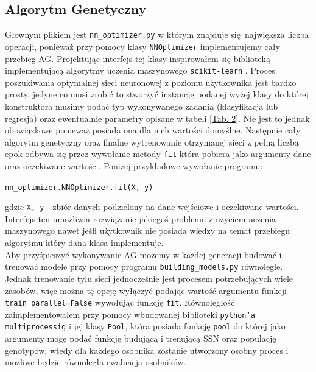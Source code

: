 \documentclass{article}
\begin{document}
\subsection{Algorytm Genetyczny}
Głownym plikiem jest \texttt{nn\_optimizer.py} w którym znajduje się największa liczba operacji,
ponieważ przy pomocy klasy \texttt{NNOptimizer} implementujemy cały przebieg AG.
Projektując interfejs tej klasy inspirowałem się biblioteką implementującą
algorytmy uczenia maszynowego \texttt{scikit-learn} \cite{sklearn_api}. Proces poszukiwania
optymalnej sieci neuronowej z poziomu użytkownika jest bardzo prosty, jedyne co musi zrobić
to stworzyć instancję podanej wyżej klasy do której konstruktora musimy podać typ wykonywanego
zadania (klasyfikacja lub regresja) oraz ewentualnie parametry opisane w tabeli 
[\hyperref[tab:params]{Tab. 2}]. Nie jest to jednak obowiązkowe ponieważ posiada ona dla nich
wartości domyślne.
Następnie cały algorytm genetyczny oraz finalne wytrenowanie otrzymanej sieci z pełną
liczbą epok odbywa się przez wywołanie metody \texttt{fit} która pobiera jako argumenty
dane oraz oczekiwane wartości. Poniżej przykładowe wywołanie programu:\\
\begin{center}
	\texttt{nn\_optimizer.NNOptimizer.fit(X, y)}\\
\end{center}
gdzie \texttt{X, y} - zbiór danych podzielony na dane wejściowe i oczekiwane wartości.\\
Interfejs ten umożliwia rozwiązanie jakiegoś problemu z użyciem uczenia maszynowego
nawet jeśli użytkownik nie posiada wiedzy na temat przebiegu algorytmu który dana klasa 
implementuje.\\
\newline
Aby przyśpieszyć wykonywanie AG możemy w każdej generacji budować i trenować 
modele przy pomocy programu \texttt{building\_models.py} równolegle. Jednak trenowanie tylu
sieci jednocześnie jest procesem potrzebujących wiele zasobów, więc można tę opcję wyłączyć
podając wartość argumentu funkcji \texttt{train\_parallel=False} wywołując funkcję 
\texttt{fit}.
Równoległość zaimplementowałem przy pomocy wbudowanej biblioteki \texttt{python'a}
\texttt{multiprocessig} i jej klasy \texttt{Pool}, która posiada
funkcję \texttt{pool} do której jako argumenty mogę podać funkcję budującą i trenującą 
SSN oraz populację genotypów, wtedy dla każdego osobnika zostanie utworzony osobny proces
i możliwe będzie równoległa ewaluacja osobników.
\end{document}
